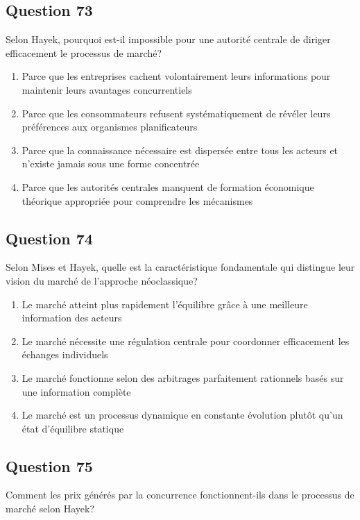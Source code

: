 \documentclass[12pt,a4paper]{article}
\begin{document}
\subsection*{Question 73}
Selon Hayek, pourquoi est-il impossible pour une autorité centrale de diriger efficacement le processus de marché?

\begin{enumerate}[label=\Alph*., leftmargin=*]
\item Parce que les entreprises cachent volontairement leurs informations pour maintenir leurs avantages concurrentiels
\item Parce que les consommateurs refusent systématiquement de révéler leurs préférences aux organismes planificateurs
\item Parce que la connaissance nécessaire est dispersée entre tous les acteurs et n'existe jamais sous une forme concentrée
\item Parce que les autorités centrales manquent de formation économique théorique appropriée pour comprendre les mécanismes
\end{enumerate}

\bigskip


\subsection*{Question 74}
Selon Mises et Hayek, quelle est la caractéristique fondamentale qui distingue leur vision du marché de l'approche néoclassique?

\begin{enumerate}[label=\Alph*., leftmargin=*]
\item Le marché atteint plus rapidement l'équilibre grâce à une meilleure information des acteurs
\item Le marché nécessite une régulation centrale pour coordonner efficacement les échanges individuels
\item Le marché fonctionne selon des arbitrages parfaitement rationnels basés sur une information complète
\item Le marché est un processus dynamique en constante évolution plutôt qu'un état d'équilibre statique
\end{enumerate}

\bigskip


\subsection*{Question 75}
Comment les prix générés par la concurrence fonctionnent-ils dans le processus de marché selon Hayek?
\end{document}
